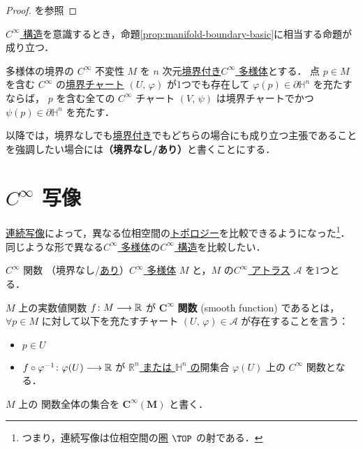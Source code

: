 \documentclass[geometry_main]{subfiles}
\begin{document}
\begin{proof}
	\cite[Proposition 1.40]{Lee12}を参照
\end{proof}

\hyperref[diffmani]{$C^\infty$ 構造}を意識するとき，命題\ref{prop:manifold-boundary-basic}に相当する命題が成り立つ．

\begin{mytheo}[label=thm:smooth-invariance-of-boundary]{多様体の境界の $C^\infty$ 不変性}
	$M$ を $n$ 次元\hyperref[def:mani-with-boundary]{境界付き}\hyperref[diffmani]{$C^\infty$ 多様体}とする．
	点 $p \in M$ を含む $C^\infty$ の\hyperref[def:mani-with-boundary]{境界チャート} $(U,\, \varphi)$ が1つでも存在して $\varphi(p) \in \partial \mathbb{H}^n$ を充たすならば，
	$p$ を含む全ての $C^\infty$ チャート $(V,\, \psi)$ は境界チャートでかつ $\psi(p) \in \partial \mathbb{H}^n$ を充たす．
\end{mytheo}

以降では，境界なしでも\hyperref[def:mani-with-boundary]{境界付き}でもどちらの場合にも成り立つ主張であることを強調したい場合には\textbf{（境界なし/あり）}と書くことにする．

\section{$C^\infty$ 写像}

\hyperref[def.continuous]{連続写像}によって，異なる位相空間の\hyperref[ax.topo]{トポロジー}を比較できるようになった\footnote{つまり，連続写像は位相空間の\hyperref[def:category]{圏} $\TOP$ の射である．}．
同じような形で異なる\hyperref[diffmani]{$C^\infty$ 多様体}の\hyperref[diffmani]{$C^\infty$ 構造}を比較したい．

\begin{mydef}[label=def.cinfty]{$C^\infty$ 関数}
	（境界なし/\hyperref[def:mani-with-boundary]{あり}）\hyperref[diffmani]{$C^\infty$ 多様体} $M$ と，$M$ の\hyperref[diffmani]{$C^\infty$ アトラス} $\mathcal{A}$ を1つとる．
	
	$M$ 上の実数値関数 $f\colon M \longrightarrow \mathbb{R}$ が $\bm{C^\infty}$ \textbf{関数} (smooth function) であるとは，
	$\forall p \in M$ に対して以下を充たすチャート $(U,\, \varphi) \in \mathcal{A}$ が存在することを言う：
	\begin{itemize}
		\item $p \in U$
		\item $f\circ \varphi^{-1} \colon \varphi(U) \longrightarrow \mathbb{R}$ が \underline{$\mathbb{R}^n$ または $\mathbb{H}^n$ の}開集合 $\varphi(U)$ 上の $C^\infty$ 関数となる．
	\end{itemize}
	\tcblower
	$M$ 上の \cinfty 関数全体の集合を $\bm{C^\infty (M)}$ と書く．
\end{mydef}
\end{document}
